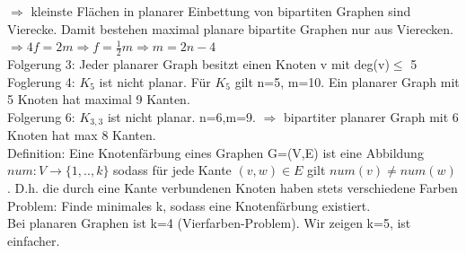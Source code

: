 \documentclass[a4paper]{article}
\begin{document}
$\Rightarrow$ kleinste Flächen in planarer Einbettung von bipartiten Graphen sind Vierecke. Damit bestehen maximal planare bipartite Graphen nur aus Vierecken. $\Rightarrow 4f=2m \Rightarrow f=\frac{1}{2}m \Rightarrow m=2n-4$\\
Folgerung 3: Jeder planarer Graph besitzt einen Knoten v mit deg(v)$\leq$ 5\\
Foglerung 4: $K_5$ ist nicht planar. Für $K_5$ gilt n=5, m=10. Ein planarer Graph mit 5 Knoten hat maximal 9 Kanten.\\
Folgerung 6: $K_{3,3}$ ist nicht planar. n=6,m=9. $\Rightarrow$ bipartiter planarer Graph mit 6 Knoten hat max 8 Kanten.\\

Definition: Eine Knotenfärbung eines Graphen G=(V,E) ist eine Abbildung $num: V\rightarrow\{1,..,k\}$ sodass für jede Kante $(v,w)\in E$ gilt $num(v)\neq num(w)$. D.h. die durch eine Kante verbundenen Knoten haben stets verschiedene Farben\\
Problem: Finde minimales k, sodass eine Knotenfärbung existiert.\\
Bei planaren Graphen ist k=4 (Vierfarben-Problem). Wir zeigen k=5, ist einfacher.
\end{document}
